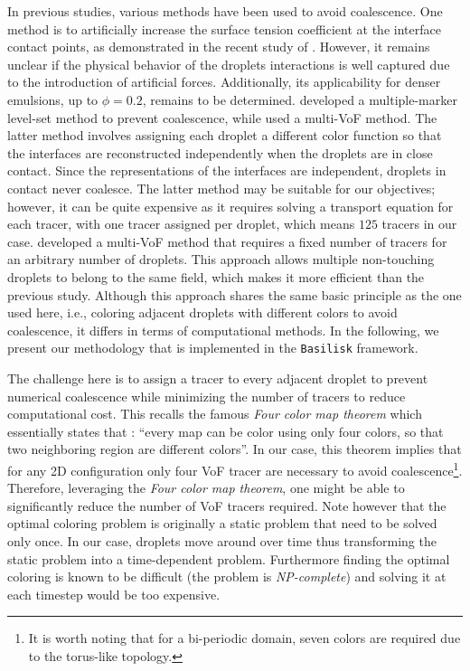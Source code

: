 \documentclass[11pt]{My_preprint}
\begin{document}
In previous studies, various methods have been used to avoid coalescence. 
One method is to artificially increase the surface tension coefficient at the interface contact points, as demonstrated in the recent study of \citet{hidman2023assessing}.
However, it remains unclear if the physical behavior of the droplets interactions is well captured due to the introduction of artificial forces. 
Additionally, its applicability for denser emulsions, up to $\phi = 0.2$, remains to be determined. 
\citet{balcazar2015multiple} developed a multiple-marker level-set method to prevent coalescence, while \citet{zhang2021direct} used a multi-VoF method. 
The latter method involves assigning each droplet a different color function so that the interfaces are reconstructed independently when the droplets are in close contact.
Since the representations of the interfaces are independent, droplets in contact never coalesce.  
The latter method may be suitable for our objectives; however, it can be quite expensive as it requires solving a transport equation for each tracer, with one tracer assigned per droplet, which means $125$ tracers in our case. 
\citet{karnakov2022computing} developed a multi-VoF method that requires a fixed number of tracers for an arbitrary number of droplets.
This approach allows multiple non-touching droplets to belong to the same field, which makes it more efficient than the previous study.
Although this approach shares the same basic principle as the one used here, i.e., coloring adjacent droplets with different colors to avoid coalescence, it differs in terms of computational methods. 
In the following, we present our methodology that is implemented in the \texttt{Basilisk} framework. 

The challenge here is to assign a tracer to every adjacent droplet to prevent numerical coalescence while minimizing the number of tracers to reduce computational cost. 
This recalls the famous \textit{Four color map theorem} \citep{appel1977solution} which essentially states that : 
\enquote{every map can be color using only four colors, so that two neighboring region are different colors}. 
In our case, this theorem implies that for any 2D configuration only four VoF tracer are necessary to avoid coalescence\footnote{It is worth noting that for a bi-periodic domain, seven colors are required due to the torus-like topology.  }. 
Therefore, leveraging the \textit{Four color map theorem}, one might be able to significantly reduce the number of VoF tracers required.
Note however that the optimal coloring problem is originally a static problem that need to be solved only once. 
In our case, droplets move around over time thus transforming the static problem into a time-dependent problem. 
Furthermore finding the optimal coloring is known to be difficult (the problem is {\em NP-complete}) and solving it at each timestep would be too expensive.
\end{document}
